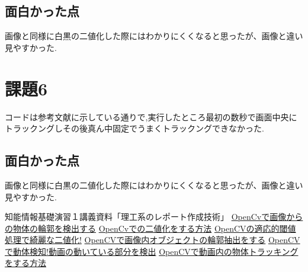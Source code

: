 \documentclass[a4paper, 11pt]{jsarticle}
\begin{document}
\subsection{面白かった点}
画像と同様に白黒の二値化した際にはわかりにくくなると思ったが、画像と違い見やすかった.


\section{課題6}
コードは参考文献\cite{six}に示している通りで,実行したところ最初の数秒で画面中央にトラックングしその後真ん中固定でうまくトラックングできなかった.

\subsection{面白かった点}
画像と同様に白黒の二値化した際にはわかりにくくなると思ったが、画像と違い見やすかった.

\begin{thebibliography}{99}
\clearpage
{} 知能情報基礎演習１講義資料「理工系のレポート作成技術」 
 \href{https://www.learning-nao.com/?p=2006/}{OpenCvで画像からの物体の輪郭を検出する}
 \href{https://watlab-blog.com/2019/05/25/opencv-binary/}{OpenCvでの二値化をする方法}
 \href{https://watlab-blog.com/2019/05/26/opencv-adaptive-threshold/}{OpenCVの適応的閾値処理で綺麗な二値化!}
 \href{https://watlab-blog.com/2020/03/19/find-contours/}{OpenCVで画像内オブジェクトの輪郭抽出をする}
 \href{https://watlab-blog.com/2019/09/26/motion-detection/}{OpenCVで動体検知!動画の動いている部分を検出}
 \href{https://watlab-blog.com/2020/03/21/object-tracking/}{OpenCVで動画内の物体トラッキングをする方法}
\end{thebibliography}
\end{document}
